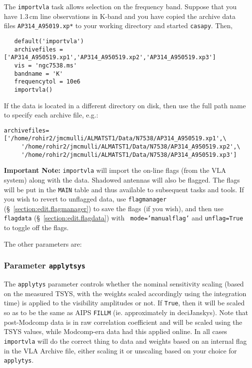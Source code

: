 The {\tt importvla} task allows selection on the frequency band.
Suppose that you have 1.3\,cm line observations in K-band and you
have copied the archive data files {\tt AP314\_A95019.xp*} to your 
working directory and started {\tt casapy}.  Then,
\small
\begin{verbatim}
   default('importvla')
   archivefiles = ['AP314_A950519.xp1','AP314_A950519.xp2','AP314_A950519.xp3']
   vis = 'ngc7538.ms' 
   bandname = 'K' 
   frequencytol = 10e6
   importvla()
\end{verbatim}
\normalsize
If the data is located in a different directory on disk, then use the
full path name to specify each archive file, e.g.:
\small
\begin{verbatim}
archivefiles=['/home/rohir2/jmcmulli/ALMATST1/Data/N7538/AP314_A950519.xp1',\
     '/home/rohir2/jmcmulli/ALMATST1/Data/N7538/AP314_A950519.xp2',\
     '/home/rohir2/jmcmulli/ALMATST1/Data/N7538/AP314_A950519.xp3']
\end{verbatim}
\normalsize

{\bf Important Note:} {\tt importvla} will import the on-line flags
(from the VLA system) along with the data. Shadowed antennas will also
be flagged. The flags will be put in the {\tt MAIN} table and thus
available to subsequent tasks and tools.  If you wish to revert to
unflagged data, use {\tt flagmanager}
(\S~\ref{section:edit.flagmanager}) to save the flags (if you wish),
and then use {\tt flagdata} (\S~\ref{section:edit.flagdata}) with {\tt
  mode='manualflag'} and {\tt unflag=True} to toggle off the flags.

The other parameters are:

\subsubsection{Parameter {\tt applytsys} }
\label{section:io.import.vla.applytsys}

The {\tt applytys} parameter controls whether the nominal sensitivity
scaling (based on the measured TSYS, with the weights scaled
accordingly using the integration time) is
applied to the visibility amplitudes or not.  If {\tt True}, then it
will be scaled so as to be the same as AIPS {\tt FILLM}
(ie. approximately in deciJanskys).
Note that post-Modcomp data is in raw correlation coefficient and will
be scaled using the TSYS values, while Modcomp-era data had this
applied online.  
In all cases {\tt importvla} will do
the correct thing to data and weights based on an internal flag in the
VLA Archive file, either scaling it or unscaling based on your choice
for {\tt applytys}.


